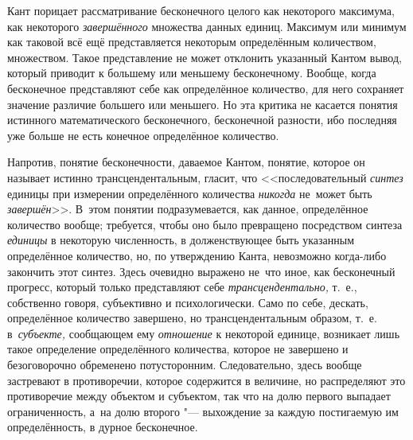 Кант порицает рассматривание бесконечного целого как некоторого максимума, как
некоторого {\em завершённого} множества данных единиц. Максимум или минимум как
таковой всё ещё представляется некоторым определённым количеством, множеством.
Такое представление не может отклонить указанный Кантом вывод, который приводит
к большему или меньшему бесконечному. Вообще, когда бесконечное представляют
себе как определённое количество, для него сохраняет значение различие большего
или меньшего. Но эта критика не касается понятия истинного математического
бесконечного, бесконечной разности, ибо последняя уже больше не есть конечное
определённое количество.

Напротив, понятие бесконечности, даваемое Кантом, понятие, которое он называет
истинно трансцендентальным, гласит, что <<последовательный {\em синтез} единицы
при измерении определённого количества {\em никогда} не~может быть
{\em завершён}>>. В~этом понятии подразумевается, как данное, определённое
количество вообще; требуется, чтобы оно было превращено посредством синтеза
{\em единицы} в некоторую численность, в долженствующее быть указанным
определённое количество, но, по утверждению Канта, невозможно когда-либо
закончить этот синтез. Здесь очевидно выражено не~что иное, как бесконечный
прогресс, который только представляют себе {\em трансцендентально,} т.~е.,
собственно говоря, субъективно и психологически. Само по себе, дескать,
определённое количество завершено, но трансцендентальным образом, т.~е.
в~{\em субъекте,} сообщающем ему {\em отношение} к некоторой единице, возникает
лишь такое определение определённого количества, которое не завершено и
безоговорочно обременено потусторонним. Следовательно, здесь вообще застревают
в противоречии, которое содержится в величине, но распределяют это противоречие
между объектом и субъектом, так что на долю первого выпадает ограниченность,
а~на долю второго "--- выхождение за каждую постигаемую им
определённость, в дурное бесконечное.


